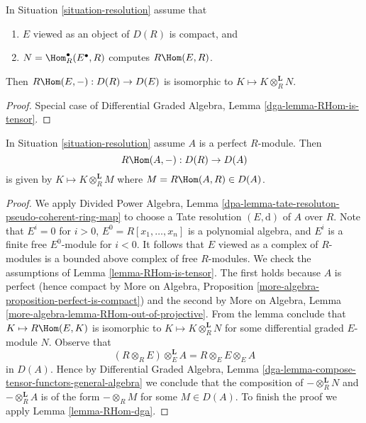 \begin{lemma}
\label{lemma-RHom-is-tensor}
In Situation \ref{situation-resolution} assume that
\begin{enumerate}
\item $E$ viewed as an object of $D(R)$ is compact, and
\item $N = \Hom^\bullet_R(E^\bullet, R)$ computes $R\Hom(E, R)$.
\end{enumerate}
Then $R\Hom(E, -) : D(R) \to D(E)$ is isomorphic to
$K \mapsto K \otimes_R^\mathbf{L} N$.
\end{lemma}

\begin{proof}
Special case of Differential Graded Algebra, Lemma
\ref{dga-lemma-RHom-is-tensor}.
\end{proof}

\begin{lemma}
\label{lemma-RHom-is-tensor-special}
In Situation \ref{situation-resolution} assume $A$ is a perfect $R$-module.
Then
$$
R\Hom(A, -) : D(R) \to D(A)
$$
is given by $K \mapsto K \otimes_R^\mathbf{L} M$
where $M = R\Hom(A, R) \in D(A)$.
\end{lemma}

\begin{proof}
We apply Divided Power Algebra, Lemma
\ref{dpa-lemma-tate-resoluton-pseudo-coherent-ring-map}
to choose a Tate resolution $(E, \text{d})$ of $A$ over $R$.
Note that $E^i = 0$ for $i > 0$, $E^0 = R[x_1, \ldots, x_n]$
is a polynomial algebra, and $E^i$ is a finite free $E^0$-module
for $i < 0$. It follows that $E$ viewed as a complex of $R$-modules
is a bounded above complex of free $R$-modules.
We check the assumptions of Lemma \ref{lemma-RHom-is-tensor}.
The first holds because $A$ is perfect
(hence compact by More on Algebra, Proposition
\ref{more-algebra-proposition-perfect-is-compact})
and the second by
More on Algebra, Lemma \ref{more-algebra-lemma-RHom-out-of-projective}.
From the lemma conclude that $K \mapsto R\Hom(E, K)$ is
isomorphic to $K \mapsto K \otimes_R^\mathbf{L} N$ for
some differential graded $E$-module $N$. Observe that
$$
(R \otimes_R E) \otimes_E^\mathbf{L} A = R \otimes_E E \otimes_E A
$$
in $D(A)$. Hence by Differential Graded Algebra, Lemma
\ref{dga-lemma-compose-tensor-functors-general-algebra}
we conclude that the composition of
$- \otimes_R^\mathbf{L} N$ and $- \otimes_R^\mathbf{L} A$
is of the form $- \otimes_R M$ for some $M \in D(A)$.
To finish the proof we apply Lemma \ref{lemma-RHom-dga}.
\end{proof}

